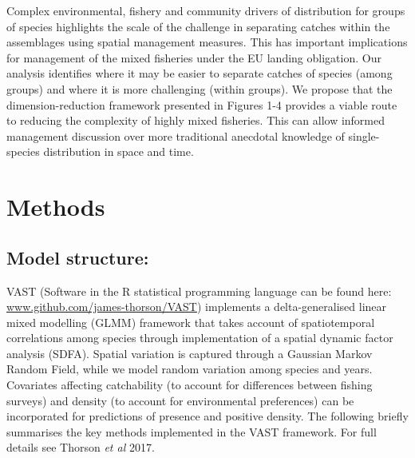 \documentclass[fleqn,10pt]{wlscirep}
\begin{document}
\begin{linenumbers}
Complex environmental, fishery and community drivers of distribution for groups
of species highlights the scale of the challenge in separating catches within
the assemblages using spatial management measures. This has important
implications for management of the mixed fisheries under the EU landing
obligation. Our analysis identifies where it may be easier to separate catches
of species (among groups) and where it is more challenging (within groups). We
propose that the dimension-reduction framework presented in Figures 1-4
provides a viable route to reducing the complexity of highly mixed fisheries.
This can allow informed management discussion over more traditional anecdotal
knowledge of single-species distribution in space and time.\\

\section*{Methods\\}

\subsection*{Model structure:\\} 

VAST (Software in the R statistical programming language can be found here:
\url{www.github.com/james-thorson/VAST}) implements a delta-generalised linear
mixed modelling (GLMM) framework that takes account of spatiotemporal
correlations among species through implementation of a spatial dynamic factor
analysis (SDFA). Spatial variation is captured through a Gaussian Markov Random
Field, while we model random variation among species and years. Covariates
affecting catchability (to account for differences between fishing surveys) and
density (to account for environmental preferences) can be incorporated for
predictions of presence and positive density. The following briefly summarises
the key methods implemented in the VAST framework. For full details see Thorson
\textit{et al} 2017\cite{Thorson2017}.\\


\end{linenumbers}
\end{document}
